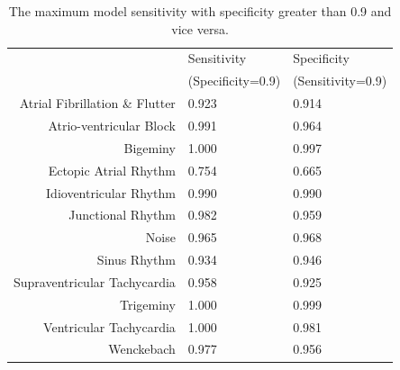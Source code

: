 \begin{table}
\centering
\begin{tabular}{r l l}
\toprule
             & Sensitivity       & Specificity  \\
             & (Specificity=0.9) & (Sensitivity=0.9) \\
\midrule
Atrial Fibrillation \& Flutter & 0.923 & 0.914 \\
Atrio-ventricular Block        & 0.991 & 0.964 \\
Bigeminy                       & 1.000 & 0.997 \\
Ectopic Atrial Rhythm          & 0.754 & 0.665 \\
Idioventricular Rhythm         & 0.990 & 0.990 \\
Junctional Rhythm              & 0.982 & 0.959 \\
Noise                          & 0.965 & 0.968 \\
Sinus Rhythm                   & 0.934 & 0.946 \\
Supraventricular Tachycardia   & 0.958 & 0.925 \\
Trigeminy                      & 1.000 & 0.999 \\
Ventricular Tachycardia        & 1.000 & 0.981 \\
Wenckebach                     & 0.977 & 0.956 \\
\bottomrule
\end{tabular}
\caption{The maximum model sensitivity with specificity greater than 0.9 and
         vice versa.}
\label{tab:arrhythmias:sens_spec}
\end{table}

